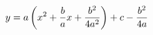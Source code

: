 \documentclass[preview]{standalone}
\begin{document}
\begin{align*}
\special{dvisvgm:raw <g id='unique000'>}y = a\left(x^2 + \frac{b}{a}x + \frac{b^2}{4a^2}\right) + c - \frac{b^2}{4a}\special{dvisvgm:raw </g>}
\end{align*}
\end{document}
